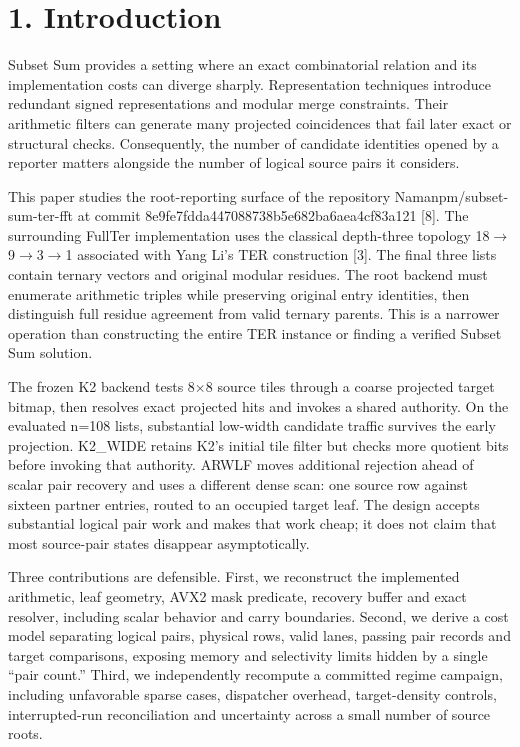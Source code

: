 \documentclass[10pt,letterpaper]{article}
\begin{document}
\section*{1. Introduction}

Subset Sum provides a setting where an exact combinatorial relation and its implementation costs can diverge sharply. Representation techniques introduce redundant signed representations and modular merge constraints. Their arithmetic filters can generate many projected coincidences that fail later exact or structural checks. Consequently, the number of candidate identities opened by a reporter matters alongside the number of logical source pairs it considers.


This paper studies the root-reporting surface of the repository Namanpm/subset-sum-ter-fft at commit 8e9fe7fdda447088738b5e682ba6aea4cf83a121 [8]. The surrounding FullTer implementation uses the classical depth-three topology 18\ensuremath{\rightarrow}9\ensuremath{\rightarrow}3\ensuremath{\rightarrow}1 associated with Yang Li's TER construction [3]. The final three lists contain ternary vectors and original modular residues. The root backend must enumerate arithmetic triples while preserving original entry identities, then distinguish full residue agreement from valid ternary parents. This is a narrower operation than constructing the entire TER instance or finding a verified Subset Sum solution.


The frozen K2 backend tests 8\ensuremath{\times}8 source tiles through a coarse projected target bitmap, then resolves exact projected hits and invokes a shared authority. On the evaluated n=108 lists, substantial low-width candidate traffic survives the early projection. K2\_WIDE retains K2's initial tile filter but checks more quotient bits before invoking that authority. ARWLF moves additional rejection ahead of scalar pair recovery and uses a different dense scan: one source row against sixteen partner entries, routed to an occupied target leaf. The design accepts substantial logical pair work and makes that work cheap; it does not claim that most source-pair states disappear asymptotically.


Three contributions are defensible. First, we reconstruct the implemented arithmetic, leaf geometry, AVX2 mask predicate, recovery buffer and exact resolver, including scalar behavior and carry boundaries. Second, we derive a cost model separating logical pairs, physical rows, valid lanes, passing pair records and target comparisons, exposing memory and selectivity limits hidden by a single ``pair count.'' Third, we independently recompute a committed regime campaign, including unfavorable sparse cases, dispatcher overhead, target-density controls, interrupted-run reconciliation and uncertainty across a small number of source roots.
\end{document}
